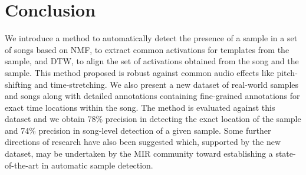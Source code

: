\documentclass{article}
\begin{document}
\section{Conclusion}


We introduce a method to automatically detect the presence of a sample in a set of songs based on NMF, to extract common activations for templates from the sample, and DTW, to align the set of activations obtained from the song and the sample. This method proposed is robust against common audio effects like pitch-shifting and time-stretching. We also present a new dataset of real-world samples and songs along with detailed annotations containing fine-grained annotations for exact time locations within the song. The method is evaluated against this dataset and we obtain 78\% precision in detecting the exact location of the sample and 74\% precision in song-level detection of a given sample. Some further directions of research have also been suggested which, supported by the new dataset, may be undertaken by the MIR community toward establishing a state-of-the-art in automatic sample detection.
\newpage


%
%
%
%
\end{document}
